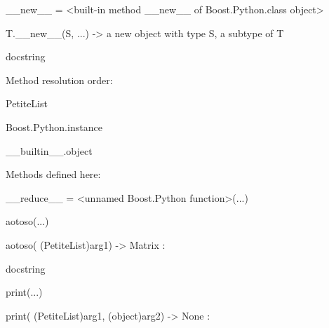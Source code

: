 \documentclass[letterpaper,10pt,english]{sphinxmanual}
\begin{document}
\begin{description}
\begin{description}
\begin{DUlineblock}{0em}
\item[] 
\item[] \_\_new\_\_ = \textless{}built-in method \_\_new\_\_ of Boost.Python.class object\textgreater{}
\item[]
\begin{DUlineblock}{\DUlineblockindent}
\item[] T.\_\_new\_\_(S, ...) -\textgreater{} a new object with type S, a subtype of T
\end{DUlineblock}
\end{DUlineblock}

\item[{class PetiteList(Boost.Python.instance)}] \leavevmode
\begin{DUlineblock}{0em}
\item[] docstring
\item[] 
\item[] Method resolution order:
\item[]
\begin{DUlineblock}{\DUlineblockindent}
\item[] PetiteList
\item[] Boost.Python.instance
\item[] \_\_builtin\_\_.object
\item[] 
\end{DUlineblock}
\item[] Methods defined here:
\item[] 
\item[] \_\_reduce\_\_ = \textless{}unnamed Boost.Python function\textgreater{}(...)
\item[] 
\item[] aotoso(...)
\item[]
\begin{DUlineblock}{\DUlineblockindent}
\item[] aotoso( (PetiteList)arg1) -\textgreater{} Matrix :
\item[]
\begin{DUlineblock}{\DUlineblockindent}
\item[] docstring
\item[] 
\end{DUlineblock}
\end{DUlineblock}
\item[] print(...)
\item[]
\begin{DUlineblock}{\DUlineblockindent}
\item[] print( (PetiteList)arg1, (object)arg2) -\textgreater{} None :

\end{DUlineblock}
\end{DUlineblock}
\end{description}
\end{description}
\end{document}
